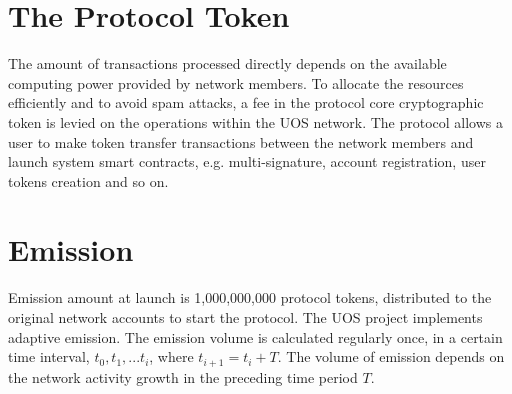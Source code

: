 \documentclass[a4paper,12pt]{article}
\begin{document}
% 
% 
% 
% 


\section{The Protocol Token}

The amount of transactions processed directly depends on the available computing power provided by network members. To allocate the resources efficiently and to avoid spam attacks, a fee in the protocol core cryptographic token is levied on the operations within the U{\degree}OS network. The protocol allows a user to make token transfer transactions between the network members and launch system smart contracts, e.g. multi-signature, account registration, user tokens creation and so on.


\section{Emission}

Emission amount at launch is 1,000,000,000 protocol tokens, distributed to the original network accounts to start the protocol. The U{\degree}OS project implements adaptive emission. The emission volume is calculated regularly once, in a certain time interval, $t_0, t_1, ... t_i$, where $t_{i+1} = t_i + T$. The volume of emission depends on the network activity growth in the preceding time period $T$.
\end{document}
